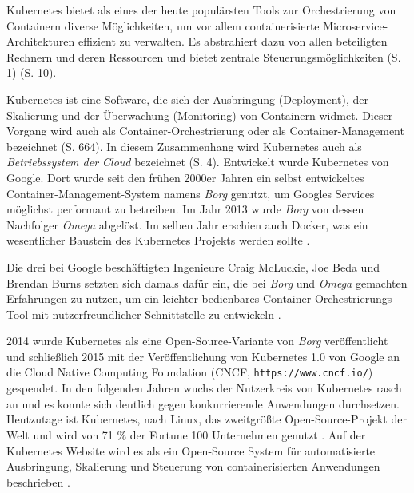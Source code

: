 \documentclass[11pt,a4paper]{article}
\begin{document}

Kubernetes bietet als eines der heute populärsten Tools zur Orchestrierung von Containern
diverse Möglichkeiten, um vor allem containerisierte Microservice-Architekturen effizient zu verwalten.
Es abstrahiert dazu von allen beteiligten Rechnern und deren Ressourcen und bietet zentrale Steuerungsmöglichkeiten
\cite{Schmeling_Dargatz_2022} (S. 1) \cite{cicd_with_kubernetes_devops} (S. 10).

Kubernetes ist eine Software, die sich der Ausbringung (Deployment), der Skalierung und der Überwachung (Monitoring) von Containern widmet.
Dieser Vorgang wird auch als Container-Orchestrierung oder als Container-Management bezeichnet \cite{Bisong2019} (S. 664).
In diesem Zusammenhang wird Kubernetes auch als \emph{Betriebssystem der Cloud} bezeichnet \cite{Schmeling_Dargatz_2022} (S. 4).
Entwickelt wurde Kubernetes von Google. Dort wurde seit den frühen 2000er Jahren ein selbst entwickeltes Container-Management-System namens \emph{Borg} genutzt,
um Googles Services möglichst performant zu betreiben.
Im Jahr 2013 wurde \emph{Borg} von dessen Nachfolger \emph{Omega} abgelöst. Im selben Jahr erschien auch Docker, was ein wesentlicher Baustein des Kubernetes
Projekts werden sollte \cite{ibm_history}.

Die drei bei Google beschäftigten Ingenieure Craig McLuckie, Joe Beda und Brendan Burns setzten sich damals dafür ein,
die bei \emph{Borg} und \emph{Omega} gemachten Erfahrungen zu nutzen, um ein leichter bedienbares Container-Orchestrierungs-Tool
mit nutzerfreundlicher Schnittstelle zu entwickeln \cite{ibm_history}.

2014 wurde Kubernetes als eine Open-Source-Variante von \emph{Borg} \cite{43438} veröffentlicht und schließlich 2015 mit der Veröffentlichung von Kubernetes 1.0
von Google an die Cloud Native Computing Foundation (CNCF, \lstinline|https://www.cncf.io/|) gespendet. In den folgenden Jahren wuchs der Nutzerkreis von Kubernetes
rasch an und es konnte sich deutlich gegen konkurrierende Anwendungen durchsetzen.
Heutzutage ist Kubernetes, nach Linux, das zweitgrößte Open-Source-Projekt der Welt und wird von 71 \% der Fortune 100 Unternehmen genutzt
\cite{ibm_history} \cite{kubernetes_journey}.
Auf der Kubernetes Website wird es als ein Open-Source System für automatisierte Ausbringung, Skalierung
und Steuerung von containerisierten Anwendungen beschrieben \cite{kubernetes.io_start}.
\end{document}
